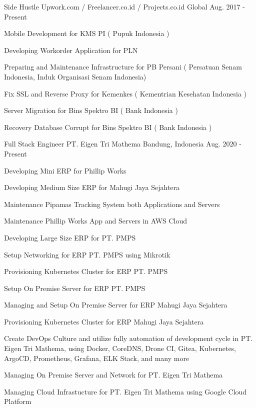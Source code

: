 \begin{cventries}
\cventry
  {Side Hustle} %
  {Upwork.com / Freelancer.co.id / Projects.co.id } %
  {Global} %
  {Aug. 2017 - Present} %
  {
    \begin{cvitems} %
      \item {Mobile Development for KMS PI ( Pupuk Indonesia ) }
      \item {Developing Workorder Application for PLN }
      \item {Preparing and Maintenance Infrastructure for PB Persani ( Persatuan Senam Indonesia, Induk Organisasi Senam Indonesia) }
      \item {Fix SSL and Reverse Proxy for Kemenkes ( Kementrian Kesehatan Indonesia ) }
      \item {Server Migration for Bins Spektro BI ( Bank Indonesia ) }
      \item {Recovery Database Corrupt for Bins Spektro BI ( Bank Indonesia ) }
    \end{cvitems}
  }

  \cventry
    {Full Stack Engineer} %
    {PT. Eigen Tri Mathema} %
    {Bandung, Indonesia} %
    {Aug. 2020 - Present} %
    {
      \begin{cvitems} %
        \item {Developing Mini ERP for Phillip Works}
        \item {Developing Medium Size ERP for Mahugi Jaya Sejahtera}
        \item {Maintenance Pipamas Tracking System both Applications and Servers}
        \item {Maintenance Phillip Works App and Servers in AWS Cloud}
        \item {Developing Large Size ERP for PT. PMPS}
        \item {Setup Networking for ERP PT. PMPS using Mikrotik}
        \item {Provisioning Kubernetes Cluster for ERP PT. PMPS}
        \item {Setup On Premise Server for ERP PT. PMPS}
        \item {Managing and Setup On Premise Server for ERP Mahugi Jaya Sejahtera}
        \item {Provisioning Kubernetes Cluster for ERP Mahugi Jaya Sejahtera}
        \item {Create DevOps Culture and utilize fully automation of development cycle in PT. Eigen Tri Mathema, using Docker, CoreDNS, Drone CI, Gitea, Kubernetes, ArgoCD, Prometheus, Grafana, ELK Stack, and many more}
        \item {Managing On Premise Server and Network for PT. Eigen Tri Mathema}
        \item {Managing Cloud Infrastucture for PT. Eigen Tri Mathema using Google Cloud Platform}
      \end{cvitems}
    }


\end{cventries}

